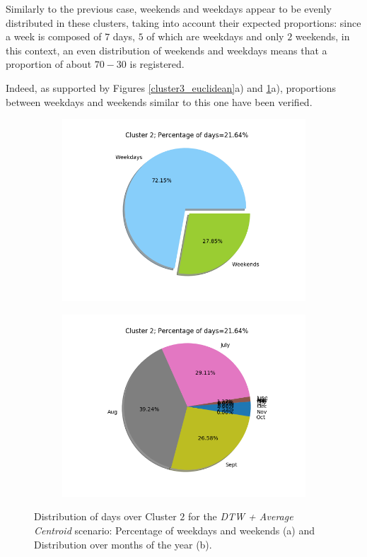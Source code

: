 \documentclass[9pt,journal,compsoc]{IEEEtran}
\begin{document}
Similarly to the previous case, weekends and weekdays appear to be evenly distributed in these clusters, taking into account their expected proportions: since a week is composed of $7$ days, $5$ of which are weekdays and only $2$ weekends, in this context, an even distribution of weekends and weekdays means that a proportion of about $70-30$ is registered.

Indeed, as supported by Figures \ref{cluster3_euclidean}a) and \ref{cluster2_raw}a), proportions between weekdays and weekends similar to this one have been verified.

\begin{figure}[H]
	\centering
	\begin{subfigure}{0.8\columnwidth}
		\includegraphics[scale=0.4]{images/percent_week_dtw_average_cluster2_k4.png}
		\caption{}
	\end{subfigure}\hfill%
	
	\begin{subfigure}{0.8\columnwidth}
		\includegraphics[scale=0.4]{images/percent_months_euc_average_cluster2_k4.png}
		\caption{}
	\end{subfigure}%
	\caption{Distribution of days over Cluster $2$ for the \emph{DTW + Average Centroid} scenario: Percentage of weekdays and weekends (a) and Distribution over months of the year (b).}
	\label{cluster2_raw}
\end{figure}
\end{document}
